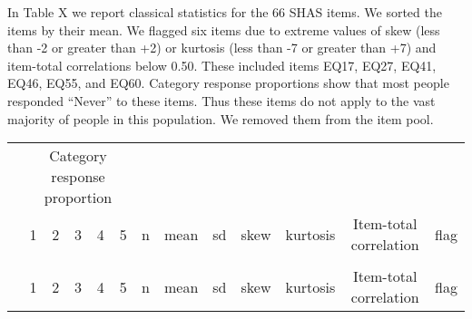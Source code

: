 \documentclass[
  letterpaper,
  DIV=11,
  numbers=noendperiod]{scrreport}
\begin{document}
In Table X we report classical statistics for the 66 SHAS items. We
sorted the items by their mean. We flagged six items due to extreme
values of skew (less than -2 or greater than +2) or kurtosis (less than
-7 or greater than +7) and item-total correlations below 0.50. These
included items EQ17, EQ27, EQ41, EQ46, EQ55, and EQ60. Category response
proportions show that most people responded ``Never'' to these items.
Thus these items do not apply to the vast majority of people in this
population. We removed them from the item pool.

\begin{longtable}[t]{>{\raggedright\arraybackslash}p{2cm}cccccccccccc}
\toprule
\multicolumn{1}{c}{ } & \multicolumn{5}{c}{Category response proportion} & \multicolumn{7}{c}{ } \\
\cmidrule(l{3pt}r{3pt}){2-6}
  & 1 & 2 & 3 & 4 & 5 & n & mean & sd & skew & kurtosis & Item-total correlation & flag\\
\midrule
\endfirsthead
\multicolumn{13}{@{}l}{\textit{(continued)}}\\
\toprule
  & 1 & 2 & 3 & 4 & 5 & n & mean & sd & skew & kurtosis & Item-total correlation & flag\\
\midrule
\endhead


\end{longtable}
\end{document}

